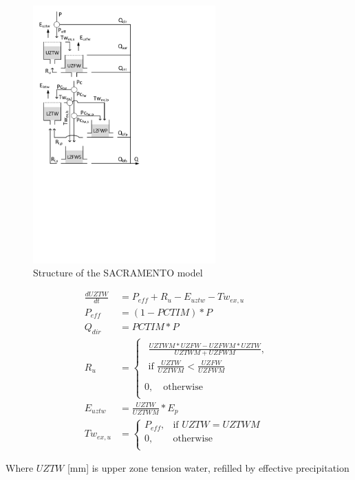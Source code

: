 { 																	%
\begin{figure}
\includegraphics[trim=1cm 11cm 7cm 1cm,width=7cm,keepaspectratio]{./AppA_files/33_schematic.pdf}
\caption{Structure of the SACRAMENTO model} \label{fig:33_schematic}
\end{figure}

\begin{align}
	\frac{dUZTW}{dt} &= P_{eff} + R_u -E_{uztw}-Tw_{ex,u} \\
	P_{eff} &= (1-PCTIM)*P\\
	Q_{dir} &= PCTIM*P\\
	R_u &= \begin{cases} 
		\begin{aligned}
			\frac{UZTWM*UZFW-UZFWM*UZTW}{UZTWM+UZFWM}, \\	
			\text{if } \frac{UZTW}{UZTWM} < \frac{UZFW}{UZFWM} \\
		\end{aligned}\\
		0, \quad \text{otherwise} \\
	\end{cases}\\
	E_{uztw} &= \frac{UZTW}{UZTWM}*E_p\\
	Tw_{ex,u} &= \begin{cases}
		P_{eff}, &\text{if } UZTW = UZTWM \\
		0, & \text{otherwise} \\
	\end{cases} 
\end{align}

Where $UZTW$ [mm] is upper zone tension water, refilled by effective precipitation 

} %


